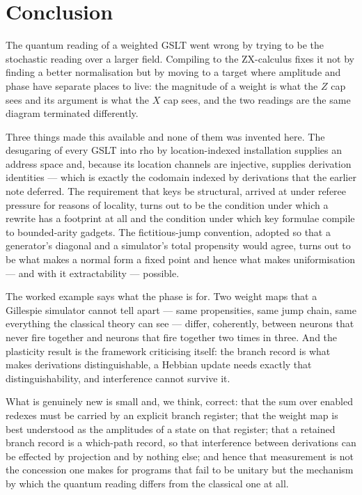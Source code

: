 \documentclass[11pt]{article}
\theoremstyle{definition}
\theoremstyle{plain}
\begin{document}
\section{Conclusion}

The quantum reading of a weighted GSLT went wrong by trying to be the stochastic reading over a
larger field. Compiling to the ZX-calculus fixes it not by finding a better normalisation but by
moving to a target where amplitude and phase have separate places to live: the magnitude of a
weight is what the $Z$ cap sees and its argument is what the $X$ cap sees, and the two readings
are the same diagram terminated differently.

Three things made this available and none of them was invented here. The desugaring of every
GSLT into rho by location-indexed installation supplies an address space and, because its
location channels are injective, supplies derivation identities --- which is exactly the
codomain indexed by derivations that the earlier note deferred. The requirement that keys be
structural, arrived at under referee pressure for reasons of locality, turns out to be the
condition under which a rewrite has a footprint at all and the condition under which key formulae
compile to bounded-arity gadgets. The fictitious-jump convention, adopted so that a generator's
diagonal and a simulator's total propensity would agree, turns out to be what makes a normal form
a fixed point and hence what makes uniformisation --- and with it extractability --- possible.

The worked example says what the phase is for. Two weight maps that a
Gillespie simulator cannot tell apart --- same propensities, same jump chain,
same everything the classical theory can see --- differ, coherently, between
neurons that never fire together and neurons that fire together two times in
three. And the plasticity result is the framework criticising itself: the
branch record is what makes derivations distinguishable, a Hebbian update needs
exactly that distinguishability, and interference cannot survive it.

What is genuinely new is small and, we think, correct: that the sum over enabled redexes must be
carried by an explicit branch register; that the weight map is best understood as the amplitudes
of a state on that register; that a retained branch record is a which-path record, so that
interference between derivations can be effected by projection and by nothing else; and hence
that measurement is not the concession one makes for programs that fail to be unitary but the
mechanism by which the quantum reading differs from the classical one at all.
\end{document}
